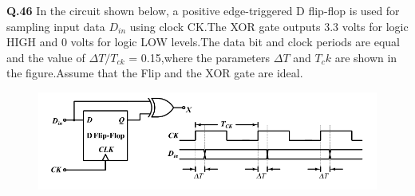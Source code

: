 \documentclass{article}
\begin{document}
\textbf{Q.46} In the circuit shown below, a positive edge-triggered D flip-flop is used for sampling input data $ D_{in} $ using clock CK.The XOR gate outputs 3.3 volts for logic HIGH and 0 volts for logic LOW levels.The data bit and clock periods are equal and the value of $ \Delta T / T_{ck} $ = 0.15,where the parameters $ \Delta T $ and $ T_ck$ are shown in the figure.Assume that the Flip and the XOR gate are ideal.
\begin{figure}[!ht]
\includegraphics[scale=0.4]{figs/image.png}
\end{figure}
\end{document}
